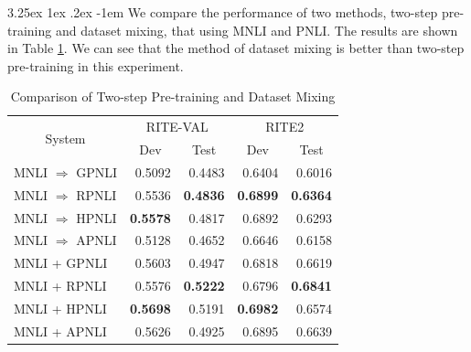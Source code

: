 \documentclass[12pt]{article}
\makeatletter
\renewcommand\paragraph{\@startsection{paragraph}{5}{\z@}%
  {3.25ex \@plus1ex \@minus.2ex}%
  {-1em}%
  {\normalfont\normalsize\bfseries}}
\makeatother
\begin{document}
\begin{CJK*}{UTF8}{bkai}
\begin{spacing}{1.77}
\paragraph{}
We compare the performance of two methods, two-step pre-training and dataset mixing, that using MNLI and PNLI. The results are shown in Table \ref{tab:cmp_mixed_2step}. We can see that the method of dataset mixing is better than two-step pre-training in this experiment.

\begin{table}[H]
  \centering
  \setlength{\extrarowheight}{-3pt}
  \caption{Comparison of Two-step Pre-training and Dataset Mixing}
  \label{tab:cmp_mixed_2step}
  \begin{tabular}{|l|r|r|r|r|}
  \hline
  \multicolumn{1}{|c|}{\multirow{2}{*}{System}} & \multicolumn{2}{c|}{RITE-VAL} & \multicolumn{2}{c|}{RITE2} \\ \cline{2-5}
  \multicolumn{1}{|c|}{} & \multicolumn{1}{c|}{Dev} & \multicolumn{1}{c|}{Test} & \multicolumn{1}{c|}{Dev} & \multicolumn{1}{c|}{Test} \\ \hline
  MNLI $\Rightarrow$ GPNLI & 0.5092 & 0.4483 & 0.6404 & 0.6016 \\ \hline
  MNLI $\Rightarrow$ RPNLI & 0.5536 & \textbf{0.4836} & \textbf{0.6899} & \textbf{0.6364} \\ \hline
  MNLI $\Rightarrow$ HPNLI & \textbf{0.5578} & 0.4817 & 0.6892 & 0.6293 \\ \hline
  MNLI $\Rightarrow$ APNLI & 0.5128 & 0.4652 & 0.6646 & 0.6158 \\
  \hline \hline
  MNLI + GPNLI & 0.5603 & 0.4947 & 0.6818 & 0.6619 \\ \hline
  MNLI + RPNLI & 0.5576 & \textbf{0.5222} & 0.6796 & \textbf{0.6841} \\ \hline
  MNLI + HPNLI & \textbf{0.5698} & 0.5191 & \textbf{0.6982} & 0.6574 \\ \hline
  MNLI + APNLI & 0.5626 & 0.4925 & 0.6895 & 0.6639 \\ \hline
  \end{tabular}
\end{table}



\end{spacing}
\end{CJK*}
\end{document}
